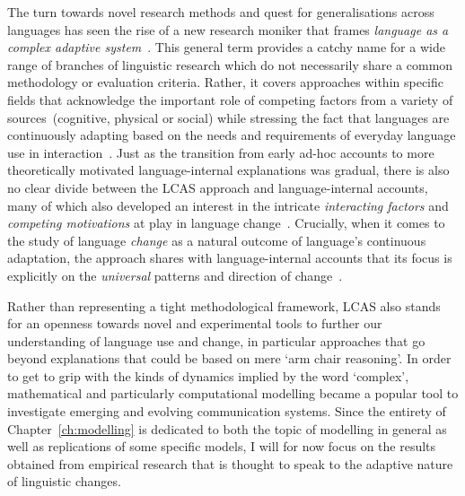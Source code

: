 The turn towards novel research methods and quest for generalisations across languages has seen the rise of a new research moniker that frames \emph{language as a complex adaptive system}~\citep[\emph{LCAS} for short, see e.g.][]{Steels1998,Steels2000,Smith2003,Situngkir2004}. This general term provides a catchy name for a wide range of branches of linguistic research which do not necessarily share a common methodology or evaluation criteria. Rather, it covers approaches within specific fields that acknowledge the important role of competing factors from a variety of sources~(cognitive, physical or social) while stressing the fact that languages are continuously adapting based on the needs and requirements of everyday language use in interaction~\citep{LCAS2009}. Just as the transition from early ad-hoc accounts to more theoretically motivated language-internal explanations was gradual, there is also no clear divide between the LCAS approach and language-internal accounts, many of which also developed an interest in the intricate \emph{interacting factors} and \emph{competing motivations} at play in language change~\citep{Vachek1962,Berg1998,Thomsen2006,MacWhinney2014}.
Crucially, when it comes to the study of language \emph{change} as a natural outcome of language's continuous adaptation, the approach shares with language-internal accounts that its focus is explicitly on the \emph{universal} patterns and direction of change~\citep[p.4-5]{LCAS2009}.

Rather than representing a tight methodological framework, LCAS also stands for an openness towards novel and experimental tools to further our understanding of language use and change, in particular approaches that go beyond explanations that could be based on mere `arm chair reasoning'. In order to get to grip with the kinds of dynamics implied by the word `complex', mathematical and particularly computational modelling became a popular tool to investigate emerging and evolving communication systems. Since the entirety of Chapter~\ref{ch:modelling} is dedicated to both the topic of modelling in general as well as replications of some specific models, I will for now focus on the results obtained from empirical research that is thought to speak to the adaptive nature of linguistic changes.

